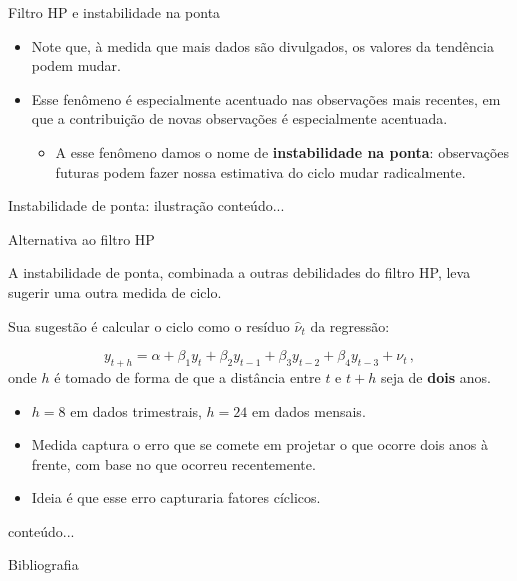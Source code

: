\documentclass[11pt]{beamer}
\newenvironment{halfwideitemize}{\itemize\addtolength{\itemsep}{0.5em}}{\enditemize}
\begin{document}
\begin{frame}{Filtro HP e instabilidade na ponta}
	\begin{itemize}
		\item Note que, à medida que mais dados são divulgados, os valores da tendência podem mudar.
		\item Esse fenômeno é especialmente acentuado nas observações mais recentes, em que a contribuição de novas observações é especialmente acentuada.
		\begin{itemize}
			\item A esse fenômeno damos o nome de \textbf{instabilidade na ponta}: observações futuras podem fazer nossa estimativa do ciclo mudar radicalmente.
		\end{itemize} 
	\end{itemize}
\end{frame}

\begin{frame}{Instabilidade de ponta: ilustração}
	conteúdo...
\end{frame}

\begin{frame}{Alternativa ao filtro HP}
	\begin{halfwideitemize}
		\item A instabilidade de ponta, combinada a outras debilidades do filtro HP, leva \citet{Hamilton2019} sugerir uma outra medida de ciclo.
		\item Sua sugestão é calcular o ciclo como o resíduo $\hat{\nu}_t$ da regressão:
		
		$$y_{t+h} = \alpha+\beta_1 y_{t} + \beta_2 y_{t-1} + \beta_3 y_{t-2} + \beta_4 y_{t-3} + \nu_t \, ,$$
		onde $h$ é tomado de forma de que a distância entre $t$ e $t+h$ seja de \textbf{dois} anos.
		\begin{itemize}
			\item $h=8$ em dados trimestrais, $h=24$ em dados mensais.
			\item Medida captura o erro que se comete em projetar o que ocorre dois anos à frente, com base no que ocorreu recentemente. 
			\item Ideia é que esse erro capturaria fatores cíclicos.
		\end{itemize}
	\end{halfwideitemize}
\end{frame}

\begin{frame}
	conteúdo...
\end{frame}

	\begin{frame}[allowframebreaks]{Bibliografia}
	\printbibliography
	\end{frame}
\end{document}
